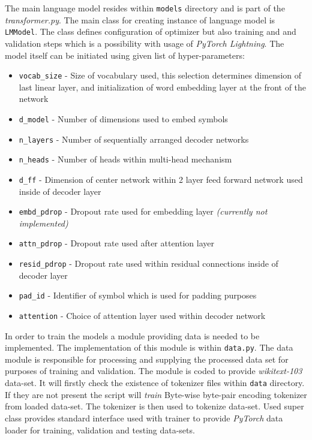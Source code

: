 The main language model resides within \texttt{models} directory and is part of the \textit{transformer.py}. The main class for creating instance of language model is \texttt{LMModel}. The class defines configuration of optimizer but also training and and validation steps which is a possibility with usage of \textit{PyTorch Lightning}. The model itself can be initiated using given list of hyper-parameters:
\begin{itemize}
    \item \texttt{vocab\_size} - Size of vocabulary used, this selection determines dimension of last linear layer, and initialization of word embedding layer at the front of the network
    \item \texttt{d\_model} - Number of dimensions used to embed symbols
    \item \texttt{n\_layers} - Number of sequentially arranged decoder networks
    \item \texttt{n\_heads} - Number of heads within multi-head mechanism
    \item \texttt{d\_ff} - Dimension of center network within 2 layer feed forward network used inside of decoder layer
    \item \texttt{embd\_pdrop} - Dropout rate used for embedding layer \textit{(currently not implemented)}
    \item \texttt{attn\_pdrop} - Dropout rate used after attention layer
    \item \texttt{resid\_pdrop} - Dropout rate used within residual connections inside of decoder layer
    \item \texttt{pad\_id} - Identifier of symbol which is used for padding purposes
    \item \texttt{attention} - Choice of attention layer used within decoder network
\end{itemize}

In order to train the models a module providing data is needed to be implemented. The implementation of this module is within \texttt{data.py}. The data module is responsible for processing and supplying the processed data set for purposes of training and validation. The module is coded to provide \textit{wikitext-103} data-set. It will firstly check the existence of tokenizer files within \texttt{data} directory. If they are not present the script will \textit{train} Byte-wise byte-pair encoding tokenizer from loaded data-set. The tokenizer is then used to tokenize data-set. Used super class provides standard interface used with trainer to provide \textit{PyTorch} data loader for training, validation and testing data-sets.

